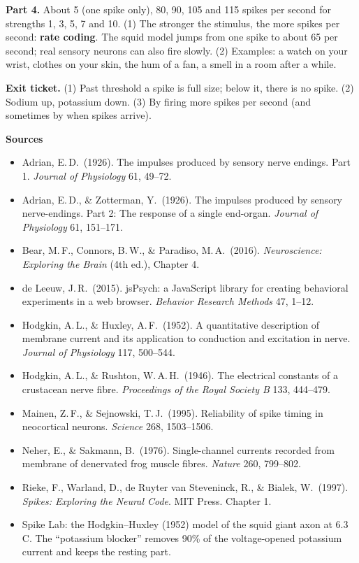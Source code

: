 \documentclass[12pt,a4paper]{article}
\newcommand{\pagehead}[1]{{\color{kprimary}\LARGE\bfseries #1}\par\vspace{2pt}{\color{kaccent}\rule{\linewidth}{1.2pt}}\par\vspace{4pt}}
\begin{document}
\textbf{Part 4.} About 5 (one spike only), 80, 90, 105 and 115 spikes per second for strengths 1, 3, 5, 7 and 10. (1) The stronger the stimulus, the more spikes per second: \textbf{rate coding}. The squid model jumps from one spike to about 65 per second; real sensory neurons can also fire slowly. (2) Examples: a watch on your wrist, clothes on your skin, the hum of a fan, a smell in a room after a while.

\textbf{Exit ticket.} (1) Past threshold a spike is full size; below it, there is no spike. (2) Sodium up, potassium down. (3) By firing more spikes per second (and sometimes by when spikes arrive).

\newpage
\pagehead{Sources}
\small
\begin{itemize}[leftmargin=1.2em,itemsep=2pt]
\item Adrian, E.\,D.\ (1926). The impulses produced by sensory nerve endings. Part 1. \emph{Journal of Physiology} 61, 49--72.
\item Adrian, E.\,D., \& Zotterman, Y.\ (1926). The impulses produced by sensory nerve-endings. Part 2: The response of a single end-organ. \emph{Journal of Physiology} 61, 151--171.
\item Bear, M.\,F., Connors, B.\,W., \& Paradiso, M.\,A.\ (2016). \emph{Neuroscience: Exploring the Brain} (4th ed.), Chapter 4.
\item de Leeuw, J.\,R.\ (2015). jsPsych: a JavaScript library for creating behavioral experiments in a web browser. \emph{Behavior Research Methods} 47, 1--12.
\item Hodgkin, A.\,L., \& Huxley, A.\,F.\ (1952). A quantitative description of membrane current and its application to conduction and excitation in nerve. \emph{Journal of Physiology} 117, 500--544.
\item Hodgkin, A.\,L., \& Rushton, W.\,A.\,H.\ (1946). The electrical constants of a crustacean nerve fibre. \emph{Proceedings of the Royal Society B} 133, 444--479.
\item Mainen, Z.\,F., \& Sejnowski, T.\,J.\ (1995). Reliability of spike timing in neocortical neurons. \emph{Science} 268, 1503--1506.
\item Neher, E., \& Sakmann, B.\ (1976). Single-channel currents recorded from membrane of denervated frog muscle fibres. \emph{Nature} 260, 799--802.
\item Rieke, F., Warland, D., de Ruyter van Steveninck, R., \& Bialek, W.\ (1997). \emph{Spikes: Exploring the Neural Code}. MIT Press. Chapter 1.
\item Spike Lab: the Hodgkin--Huxley (1952) model of the squid giant axon at 6.3\,\textdegree C. The ``potassium blocker'' removes 90\% of the voltage-opened potassium current and keeps the resting part.
\end{itemize}
\end{document}
